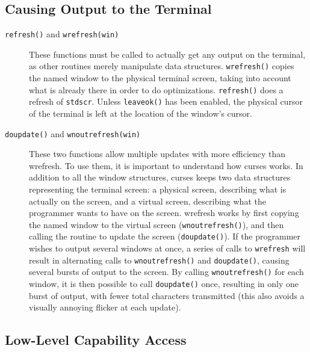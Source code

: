\subsection{Causing Output to the Terminal}

\label{f0:flush}\begin{description}\item[ \texttt{refresh()} and \texttt{wrefresh(win)}]  These functions must be called to actually get any output on
the  terminal,  as  other  routines  merely  manipulate data
structures.  \texttt{wrefresh()} copies the named window  to the physical
terminal screen,  taking  into account  what is already
there in  order to  do optimizations.  \texttt{refresh()} does a
refresh of \texttt{stdscr}.   Unless \texttt{leaveok()} has been
enabled, the physical cursor of the terminal is left at  the
location of the window's cursor.
\item[ \texttt{doupdate()} and \texttt{wnoutrefresh(win)}]  These two functions allow multiple updates with more efficiency
than wrefresh.  To use them, it is important to understand how curses
works.  In addition to all the window structures, curses keeps two
data structures representing the terminal screen: a physical screen,
describing what is actually on the screen, and a virtual screen,
describing what the programmer wants to have on the screen.  wrefresh
works by first copying the named window to the virtual screen
(\texttt{wnoutrefresh()}), and then calling the routine to update the
screen (\texttt{doupdate()}).  If the programmer wishes to output
several windows at once, a series of calls to \texttt{wrefresh} will result
in alternating calls to \texttt{wnoutrefresh()} and \texttt{doupdate()},
causing several bursts of output to the screen.  By calling
\texttt{wnoutrefresh()} for each window, it is then possible to call
\texttt{doupdate()} once, resulting in only one burst of output, with
fewer total characters transmitted (this also avoids a visually annoying
flicker at each update).
\end{description}

\subsection{Low-Level Capability Access}

